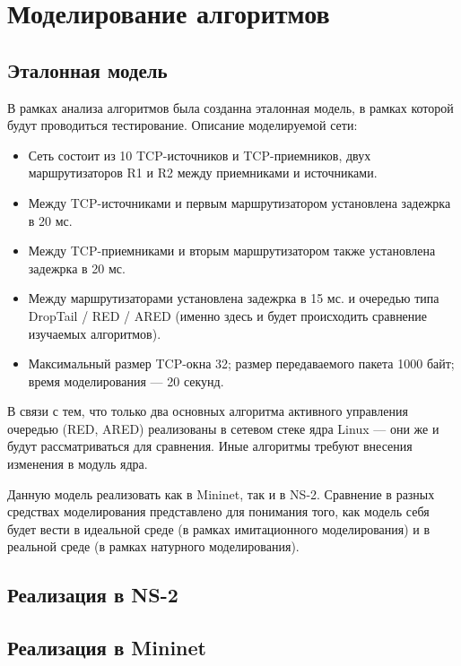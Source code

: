 \chapter{Моделирование алгоритмов}
\label{chap2}

\section{Эталонная модель}
\label{chap2:sec1}

В рамках анализа алгоритмов была созданна эталонная модель, в рамках которой
будут проводиться тестирование. Описание моделируемой сети:

\begin{itemize}

        \item Сеть состоит из 10 TCP-источников и TCP-приемников, двух
                маршрутизаторов R1 и R2 между приемниками и источниками.

        \item Между TCP-источниками и первым маршрутизатором установлена
                задежрка в 20 мс.

        \item Между TCP-приемниками и вторым маршрутизатором также установлена
                задежрка в 20 мс.

        \item Между маршрутизаторами установлена задежрка в 15 мс. и очередью
                типа DropTail / RED / ARED (именно здесь и будет происходить
                сравнение изучаемых алгоритмов).

        \item Максимальный размер TCP-окна 32; размер передаваемого пакета 1000
                байт; время моделирования --- 20 секунд.

\end{itemize}

В связи с тем, что только два основных алгоритма активного управления очередью
(RED, ARED) реализованы в сетевом стеке ядра Linux --- они же и будут
рассматриваться для сравнения. Иные алгоритмы требуют внесения изменения в
модуль ядра.

Данную модель реализовать как в Mininet, так и в NS-2. Сравнение в разных
средствах моделирования представлено для понимания того, как модель себя будет
вести в идеальной среде (в рамках имитационного моделирования) и в реальной
среде (в рамках натурного моделирования). 

\section{Реализация в NS-2} %
\label{chap2:sec2}


\section{Реализация в Mininet} %
\label{chap2:sec3}




